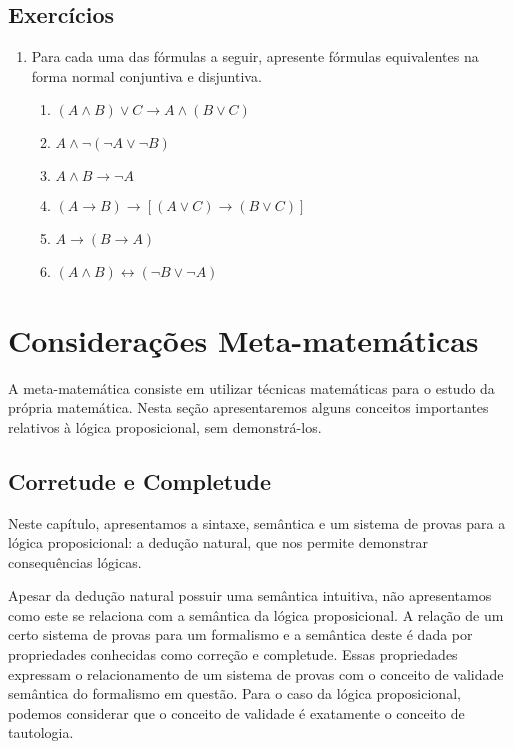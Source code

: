 \subsection{Exercícios}

\begin{enumerate}
        \item Para cada uma das fórmulas a seguir, apresente fórmulas
          equivalentes na forma normal conjuntiva e disjuntiva.
	\begin{enumerate}
		\item $(A\land B)\lor C\rightarrow A\land(B\lor C)$
		\item $A\land\neg (\neg A\lor \neg B)$
		\item $A\land B\rightarrow\neg A$
		\item $(A\rightarrow B)\rightarrow[(A\lor C)\rightarrow (B\lor C)]$
		\item $A\rightarrow(B\rightarrow A)$
		\item $(A\land B)\leftrightarrow(\neg B\lor \neg A)$
	\end{enumerate}
\end{enumerate}


\section{Considerações Meta-matemáticas}\label{soundcompleteprop}

A meta-matemática consiste em utilizar técnicas matemáticas para o
estudo da própria matemática. Nesta seção apresentaremos alguns
conceitos importantes relativos à lógica proposicional, sem demonstrá-los.

\subsection{Corretude e Completude}

Neste capítulo, apresentamos a sintaxe,
semântica e um sistema de provas para a lógica proposicional: a dedução
natural, que nos permite demonstrar consequências lógicas.

Apesar da dedução natural possuir uma semântica intuitiva, não apresentamos como este
se relaciona com a semântica da lógica proposicional. A relação de um certo sistema de
provas para um formalismo e a semântica deste é dada por propriedades
conhecidas como correção e completude. Essas propriedades expressam o
relacionamento de um sistema de provas com o conceito de validade
semântica do formalismo em questão. Para o caso da lógica
proposicional, podemos considerar que o conceito de validade é
exatamente o conceito de tautologia.

